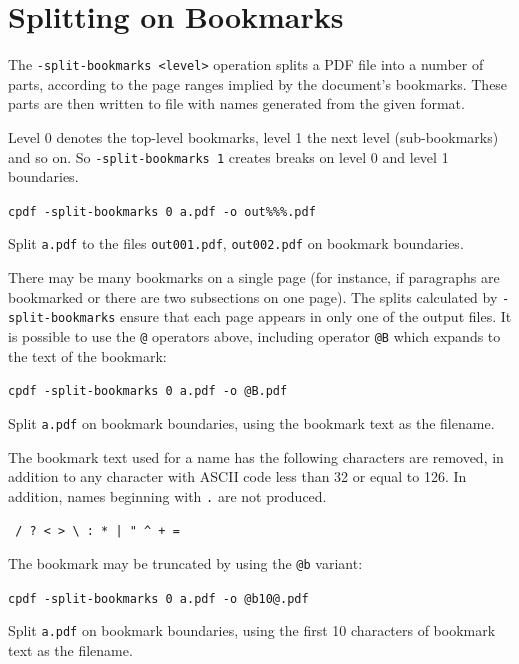 \documentclass{book}
\begin{document}
  \section{Splitting on Bookmarks}
  The \texttt{-split-bookmarks <level>} operation splits a PDF file into a number of
parts, according to the page ranges implied by the document's bookmarks. These
parts are then written to file with names generated from the given format.
  
Level 0 denotes the top-level bookmarks, level 1 the next level (sub-bookmarks)
and so on. So \texttt{-split-bookmarks 1} creates breaks on level 0 and level
1 boundaries.

  \begin{framed}\small
    \noindent\verb!cpdf -split-bookmarks 0 a.pdf -o out%%%.pdf!

    \vspace{2.5mm}
    \noindent Split \texttt{a.pdf} to the files \texttt{out001.pdf},
\texttt{out002.pdf} on bookmark boundaries.

  \end{framed}
\noindent There may be many bookmarks on a single page (for instance, if
paragraphs are bookmarked or there are two subsections on one page). The splits
calculated by \texttt{-split-bookmarks} ensure that each page appears in only
one of the output files.
  It is possible to use the \texttt{@} operators above, including operator \texttt{@B} which expands to the text of the bookmark:

  \begin{framed}\small
    \noindent\verb!cpdf -split-bookmarks 0 a.pdf -o @B.pdf!

    \vspace{2.5mm}
    \noindent Split \texttt{a.pdf} on bookmark boundaries, using the bookmark text as the filename.

  \end{framed}
\noindent The bookmark text used for a name has the following characters are removed, in addition to any character with ASCII code less than 32 or equal to 126. In addition, names beginning with \texttt{.} are not produced.
  \begin{framed}
  \centering
  \verb! / ? < > \ : * | " ^ + =!
  \end{framed}

\noindent The bookmark may be truncated by using the \texttt{@b} variant:

  \begin{framed}\small
    \noindent\verb!cpdf -split-bookmarks 0 a.pdf -o @b10@.pdf!

    \vspace{2.5mm}
    \noindent Split \texttt{a.pdf} on bookmark boundaries, using the first 10 characters of bookmark text as the filename.

  \end{framed}
\end{document}
